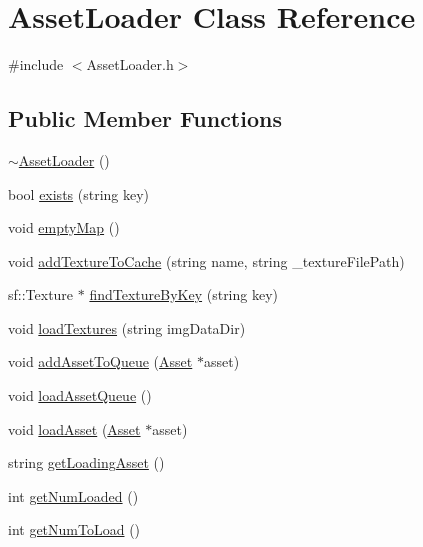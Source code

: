 \hypertarget{class_asset_loader}{}\section{Asset\+Loader Class Reference}
\label{class_asset_loader}


{\ttfamily \#include $<$Asset\+Loader.\+h$>$}

\subsection*{Public Member Functions}
\begin{DoxyCompactItemize}
\item 
\hyperlink{class_asset_loader_a4f49d2d68ee1413e1f18dc7f4d003f0c}{$\sim$\+Asset\+Loader} ()
\item 
bool \hyperlink{class_asset_loader_a02606bccd43e16913919b3e081f74f3e}{exists} (string key)
\item 
void \hyperlink{class_asset_loader_a682bc76f35e281e4f6cf3d7b19388bbb}{empty\+Map} ()
\item 
void \hyperlink{class_asset_loader_ae902ff7d59878412699ae1dd5e3b1fc0}{add\+Texture\+To\+Cache} (string name, string \+\_\+texture\+File\+Path)
\item 
sf\+::\+Texture $\ast$ \hyperlink{class_asset_loader_a0f8159b836b5d23aadf4439cba9d5e84}{find\+Texture\+By\+Key} (string key)
\item 
void \hyperlink{class_asset_loader_ad5e2c8b9ad7ce00249f9ff5404d7363c}{load\+Textures} (string img\+Data\+Dir)
\item 
void \hyperlink{class_asset_loader_aaba5217d0cfe6203f3f47d3eb5dbe50c}{add\+Asset\+To\+Queue} (\hyperlink{struct_asset}{Asset} $\ast$asset)
\item 
void \hyperlink{class_asset_loader_a20c0aca89038b89980be63b7639c89ff}{load\+Asset\+Queue} ()
\item 
void \hyperlink{class_asset_loader_acf07e2074a4c86f3312d2c162ae5a40b}{load\+Asset} (\hyperlink{struct_asset}{Asset} $\ast$asset)
\item 
string \hyperlink{class_asset_loader_aa91b6dc15ed3f4befbd0c74bc1d7f040}{get\+Loading\+Asset} ()
\item 
int \hyperlink{class_asset_loader_a2b6e924a1ded0e1758a608757e6886fe}{get\+Num\+Loaded} ()
\item 
int \hyperlink{class_asset_loader_a5c122cf239d342643f38bb9dd3de7996}{get\+Num\+To\+Load} ()
\end{DoxyCompactItemize}
